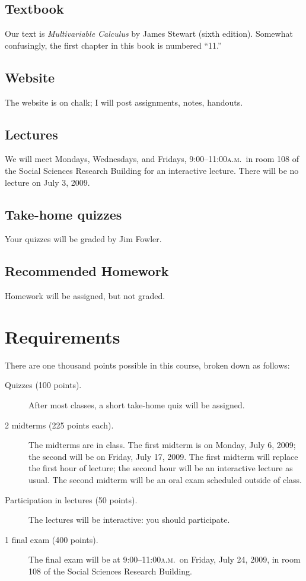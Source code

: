 \documentclass[12pt,letterpaper]{article}
\newcommand{\ayem}{\textsc{a.m.}}
\begin{document}
\subsection*{Textbook}
Our text is \textit{Multivariable Calculus} by James Stewart (sixth edition).  Somewhat confusingly, the first chapter in this book is numbered ``11.''

\subsection*{Website}
The website is on chalk; I will post assignments, notes, handouts.

\subsection*{Lectures}
We will meet Mondays, Wednesdays, and Fridays, 9:00--11:00\ayem\ in room
108 of the Social Sciences Research Building for an interactive
lecture.  There will be no lecture on July 3, 2009.

\subsection*{Take-home quizzes}
Your quizzes will be graded by Jim Fowler.

\subsection*{Recommended Homework}
Homework will be assigned, but not graded.

\pagebreak

\section*{Requirements}

There are one thousand points possible in this course, broken down as
follows:
\begin{description}
\item[Quizzes (100 points).] After most classes, a short take-home
  quiz will be assigned.
\item[2 midterms (225 points each).]  The midterms are in class.  The
  first midterm is on Monday, July 6, 2009; the second will be on
  Friday, July 17, 2009.  The first midterm will replace the first
  hour of lecture; the second hour will be an interactive lecture as
  usual.  The second midterm will be an oral exam scheduled outside of
  class.
\item[Participation in lectures (50 points).] The lectures will be
  interactive: you should participate.
\item[1 final exam (400 points).]  The final exam will be at
  9:00--11:00\ayem\ on Friday, July 24, 2009, in room 108 of the
  Social Sciences Research Building.
\end{description}
\end{document}
